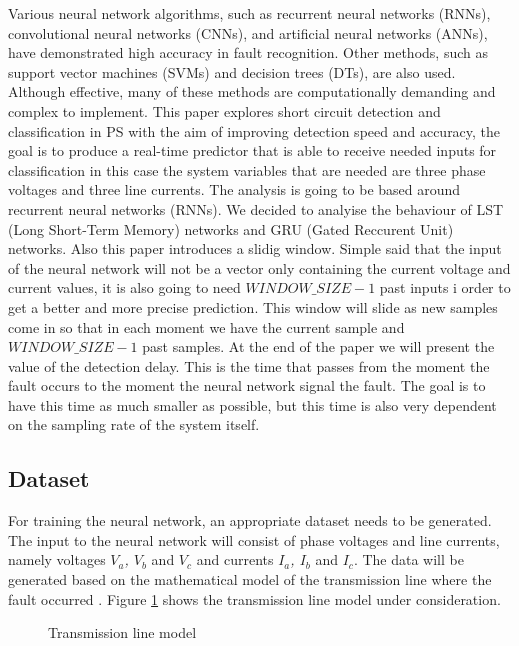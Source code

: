 \documentclass[11pt]{IEEEtran}
\begin{document}
Various neural network algorithms, such as recurrent neural networks (RNNs), convolutional neural networks (CNNs), and artificial neural networks (ANNs), have demonstrated high accuracy in fault recognition. Other methods, such as support vector machines (SVMs) and decision trees (DTs), are also used. Although effective, many of these methods are computationally demanding and complex to implement. This paper explores short circuit detection and classification in PS with the aim of improving detection speed and accuracy, the goal is to produce a real-time predictor that is able to receive needed inputs for classification in this case the system variables that are needed are three phase voltages and three line currents. The analysis is going to be based around recurrent neural networks (RNNs). We decided to analyise the behaviour of LST (Long Short-Term Memory) networks and GRU (Gated Reccurent Unit) networks. Also this paper introduces a slidig window. Simple said that the input of the neural network will not be a vector only containing the current voltage and current values, it is also going to need $WINDOW\_SIZE - 1$ past inputs i order to get a better and more precise prediction. This window will slide as new samples come in so that in each moment we have the current sample and $WINDOW\_SIZE - 1$ past samples. At the end of the paper we will present the value of the detection delay. This is the time that passes from the moment the fault occurs to the moment the neural network signal the fault. The goal is to have this time as much smaller as possible, but this time is also very dependent on the sampling rate of the system itself.

\subsection{Dataset}
For training the neural network, an appropriate dataset needs to be generated. The input to the neural network will consist of phase voltages and line currents, namely voltages \textit{$V_a$, $V_b$} and \textit{$V_c$} and currents \textit{$I_a$, $I_b$} and \textit{$I_c$}. The data will be generated based on the mathematical model of the transmission line where the fault occurred \cite{GONI2023100107}. Figure \ref{fig:transmission_line} shows the transmission line model under consideration.

\begin{figure}[t]  %
    \centering
    \caption{Transmission line model}
    \label{fig:transmission_line}  %
\end{figure}
\end{document}
